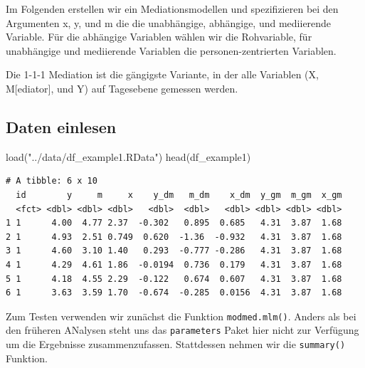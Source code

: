 \documentclass[
  letterpaper,
  DIV=11,
  numbers=noendperiod]{scrreprt}
\newenvironment{Shaded}{\begin{snugshade}}{\end{snugshade}}
\newcommand{\AttributeTok}[1]{\textcolor[rgb]{0.40,0.45,0.13}{#1}}
\newcommand{\ConstantTok}[1]{\textcolor[rgb]{0.56,0.35,0.01}{#1}}
\newcommand{\FunctionTok}[1]{\textcolor[rgb]{0.28,0.35,0.67}{#1}}
\newcommand{\NormalTok}[1]{\textcolor[rgb]{0.00,0.23,0.31}{#1}}
\newcommand{\OtherTok}[1]{\textcolor[rgb]{0.00,0.23,0.31}{#1}}
\newcommand{\SpecialCharTok}[1]{\textcolor[rgb]{0.37,0.37,0.37}{#1}}
\newcommand{\StringTok}[1]{\textcolor[rgb]{0.13,0.47,0.30}{#1}}
\begin{document}
Im Folgenden erstellen wir ein Mediationsmodellen und spezifizieren bei
den Argumenten x, y, und m die die unabhängige, abhängige, und
mediierende Variable. Für die abhängige Variablen wählen wir die
Rohvariable, für unabhängige und mediierende Variablen die
personen-zentrierten Variablen.

Die 1-1-1 Mediation ist die gängigste Variante, in der alle Variablen
(X, M{[}ediator{]}, und Y) auf Tagesebene gemessen werden.

\subsection{Daten einlesen}\label{daten-einlesen-2}

\begin{Shaded}
\begin{Highlighting}[]
\FunctionTok{load}\NormalTok{(}\StringTok{"../data/df\_example1.RData"}\NormalTok{)}
\FunctionTok{head}\NormalTok{(df\_example1)}
\end{Highlighting}
\end{Shaded}

\begin{verbatim}
# A tibble: 6 x 10
  id        y     m     x    y_dm   m_dm    x_dm  y_gm  m_gm  x_gm
  <fct> <dbl> <dbl> <dbl>   <dbl>  <dbl>   <dbl> <dbl> <dbl> <dbl>
1 1      4.00  4.77 2.37  -0.302   0.895  0.685   4.31  3.87  1.68
2 1      4.93  2.51 0.749  0.620  -1.36  -0.932   4.31  3.87  1.68
3 1      4.60  3.10 1.40   0.293  -0.777 -0.286   4.31  3.87  1.68
4 1      4.29  4.61 1.86  -0.0194  0.736  0.179   4.31  3.87  1.68
5 1      4.18  4.55 2.29  -0.122   0.674  0.607   4.31  3.87  1.68
6 1      3.63  3.59 1.70  -0.674  -0.285  0.0156  4.31  3.87  1.68
\end{verbatim}

Zum Testen verwenden wir zunächst die Funktion \texttt{modmed.mlm()}.
Anders als bei den früheren ANalysen steht uns das \texttt{parameters}
Paket hier nicht zur Verfügung um die Ergebnisse zusammenzufassen.
Stattdessen nehmen wir die \texttt{summary()} Funktion.

\begin{Shaded}
\end{Shaded}
\end{document}
